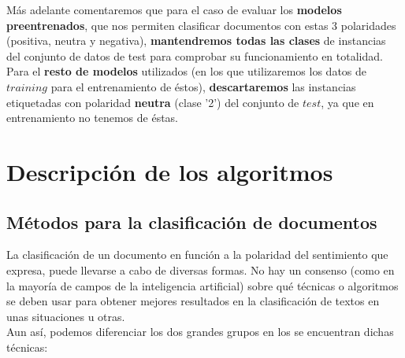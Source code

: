 \documentclass[a4paper,12pt]{report}
\begin{document}
{\setlength{\parindent}{0cm}
Más adelante comentaremos que para el caso de evaluar los \textbf{modelos preentrenados}, que nos permiten clasificar documentos con estas 3 polaridades (positiva, neutra y negativa), \textbf{mantendremos todas las clases} de instancias del conjunto de datos de test para comprobar su funcionamiento en totalidad.}
\vspace{2mm}\\
Para el \textbf{resto de modelos} utilizados (en los que utilizaremos los datos de $training$ para el entrenamiento de éstos), \textbf{descartaremos} las instancias etiquetadas con polaridad \textbf{neutra} (clase '2') del conjunto de $test$, ya que en entrenamiento no tenemos de éstas.


\chapter{Descripción de los algoritmos}

\section{Métodos para la clasificación de documentos}

{\setlength{\parindent}{0cm}
La clasificación de un documento en función a la polaridad del sentimiento que expresa, puede llevarse a cabo de diversas formas. No hay un consenso (como en la mayoría de campos de la inteligencia artificial) sobre qué técnicas o algoritmos se deben usar para obtener mejores resultados en la clasificación de textos en unas situaciones u otras. }
\vspace{2mm}\\
Aun así, podemos diferenciar los dos grandes grupos en los se encuentran dichas técnicas:
\end{document}
